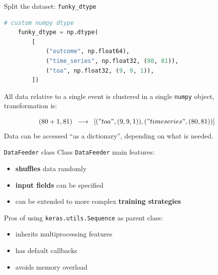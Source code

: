 \documentclass{beamer}
\begin{document}
\begin{frame}[fragile]{Split the dataset: \texttt{funky\_dtype}}

    
    \begin{lstlisting}[language=Python]
    # custom numpy dtype
    funky_dtype = np.dtype(
        [
            ("outcome", np.float64),
            ("time_series", np.float32, (80, 81)),
            ("toa", np.float32, (9, 9, 1)),
        ])
    \end{lstlisting}
    
    All data relative to a single event is clustered in a single \texttt{numpy} object, transformation is:
    
    \begin{equation*}
        (80 + 1, 81)\,\,\, \longrightarrow \,\,\, [("toa", (9, 9, 1)), ("timeseries", (80, 81))]
    \end{equation*}
    Data can be accessed ``as a dictionary'', depending on what is needed.

\end{frame}


\begin{frame}{\texttt{DataFeeder} class}
    Class \texttt{DataFeeder} main features:
    \begin{itemize}
        \item[\textbullet] \textbf{shuffles} data randomly
        \item[\textbullet] \textbf{input fields} can be specified
        \item[\textbullet] can be extended to more complex \textbf{training strategies}
    \end{itemize}
    

\vspace{20 pt}
    Pros of using \texttt{keras.utils.Sequence} as parent class:
    \begin{itemize}
        \item[\textbullet] inherits multiprocessing features
        \item[\textbullet] has default callbacks
        \item[\textbullet] avoids memory overload
    \end{itemize}
    
\end{frame}
\end{document}
